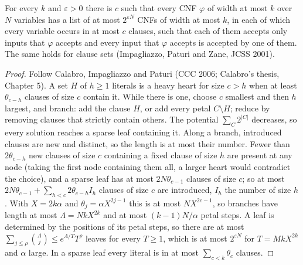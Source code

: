 \begin{theorem}
  \label{thm:lowerbounds-sparsification}
  \leanok
  For every $k$ and $\varepsilon>0$ there is $c$ such that every CNF $\varphi$ of
  width at most $k$ over $N$ variables has a list of at most $2^{\varepsilon N}$
  CNFs of width at most $k$, in each of which every variable occurs in at most $c$
  clauses, such that each of them accepts only inputs that $\varphi$ accepts and
  every input that $\varphi$ accepts is accepted by one of them. The same holds
  for clause sets (Impagliazzo, Paturi and Zane, JCSS 2001).
\end{theorem}
\begin{proof}
  \leanok
  Follow Calabro, Impagliazzo and Paturi (CCC 2006; Calabro's thesis, Chapter 5).
  A set $H$ of $h\ge1$ literals is a heavy heart for size $c>h$ when at least
  $\theta_{c-h}$ clauses of size $c$ contain it. While there is one, choose $c$
  smallest and then $h$ largest, and branch: add the clause $H$, or add every
  petal $C\setminus H$; reduce by removing clauses that strictly contain others.
  The potential $\sum_C 2^{|C|}$ decreases, so every solution reaches a sparse
  leaf containing it. Along a branch, introduced clauses are new and distinct,
  so the length is at most their number. Fewer than $2\theta_{c-h}$ new clauses of
  size $c$ containing a fixed clause of size $h$ are present at any node (taking
  the first node containing them all, a larger heart would contradict the
  choice), and a sparse leaf has at most $2N\theta_{c-1}$ clauses of size $c$; so
  at most $2N\theta_{c-1}+\sum_{h<c}2\theta_{c-h}I_h$ clauses of size $c$ are
  introduced, $I_h$ the number of size $h$. With $X=2k\alpha$ and
  $\theta_j=\alpha X^{2j-1}$ this is at most $NX^{2c-1}$, so branches have length
  at most $\Lambda=NkX^{2k}$ and at most $(k-1)N/\alpha$ petal steps. A leaf is
  determined by the positions of its petal steps, so there are at most
  $\sum_{j\le\rho}\binom{\Lambda}{j}\le e^{\Lambda/T}T^{\rho}$ leaves for every
  $T\ge1$, which is at most $2^{\varepsilon N}$ for $T=MkX^{2k}$ and $\alpha$
  large. In a sparse leaf every literal is in at most $\sum_{c<k}\theta_c$
  clauses.
\end{proof}

